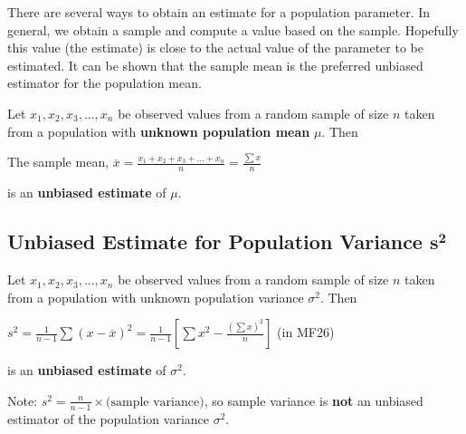 \documentclass[11pt,a4paper]{book}
\begin{document}
There are several ways to obtain an estimate for a population parameter.
In general, we obtain a sample and compute a value based on the sample.
Hopefully this value (the estimate) is close to the actual value of
the parameter to be estimated. It can be shown that the sample mean
is the preferred unbiased estimator for the population mean.

\begin{tcolorbox}[colback=blue!5, colframe=black, boxrule=.4pt, sharpish corners]

Let $x_{1},x_{2},x_{3},\ldots,x_{n}$ be observed values from a random
sample of size $n$ taken from a population with \textbf{unknown population
mean} $\mu$. Then
\begin{center}
The sample mean, ${\displaystyle \overline{x}=\frac{x_{1}+x_{2}+x_{3}+\ldots+x_{n}}{n}=\frac{\sum x}{n}}$
\par\end{center}
is an\textbf{ unbiased estimate} of $\mu$.
\end{tcolorbox}


\subsection{Unbiased Estimate for Population Variance $\boldsymbol{s^{2}}$}

\begin{tcolorbox}[colback=blue!5, colframe=black, boxrule=.4pt, sharpish corners]

Let $x_{1},x_{2},x_{3},\ldots,x_{n}$ be observed values from a random
sample of size $n$ taken from a population with unknown population
variance $\sigma^{2}$. Then
\begin{center}
${\displaystyle s^{2}=\frac{1}{n-1}\sum\left(x-\overline{x}\right)^{2}=\frac{1}{n-1}\left[\sum x^{2}-\frac{\left(\sum x\right)^{2}}{n}\right]}$
(in MF26)
\par\end{center}
\begin{flushleft}
is an\textbf{ unbiased estimate} of $\sigma^{2}$.
\par\end{flushleft}
\end{tcolorbox}

Note: ${\displaystyle s^{2}=\frac{n}{n-1}\times\text{(sample variance)}}$,
so sample variance is \textbf{not} an unbiased estimator of the population
variance $\sigma^{2}$.
\end{document}

